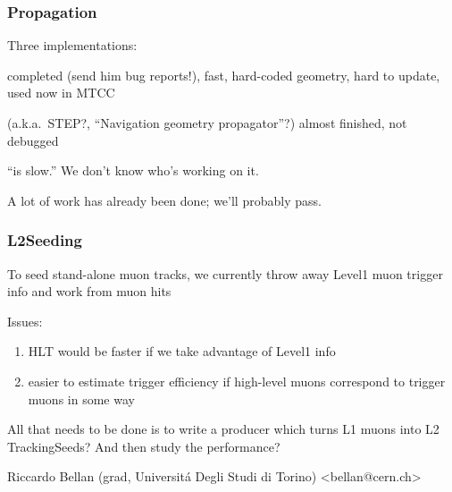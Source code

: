 \documentclass[12pt,compress]{beamer}
\begin{document}
\begin{frame}
\frametitle{Propagation}

Three implementations:

\begin{description}\setlength{\itemsep}{0.5 cm}
\item[Slava's SteppingHelixPropagator] completed (send him bug
reports!), fast, hard-coded geometry, hard to update, used now in MTCC

\item[Runge-Kutta] (a.k.a.\ STEP?, ``Navigation geometry propagator''?) almost finished, not debugged

\item[GEANT4] ``is slow.''  We don't know who's working on it.
\end{description}

\vfill
A lot of work has already been done; we'll probably pass.
\end{frame}

\begin{frame}
\frametitle{L2Seeding}

To seed stand-alone muon tracks, we currently throw away Level1 muon
trigger info and work from muon hits

\vfill Issues:
\begin{enumerate}
\item HLT would be faster if we take advantage of Level1 info
\item easier to estimate trigger efficiency if high-level muons
correspond to trigger muons in some way
\end{enumerate}

\vfill All that needs to be done is to write a producer which turns L1
muons into L2 TrackingSeeds?  And then study the performance?

\vfill \small Riccardo Bellan (grad, Universit\'a Degli Studi di Torino) \textless bellan@cern.ch\textgreater

\label{numpages}
\end{frame}
\end{document}
